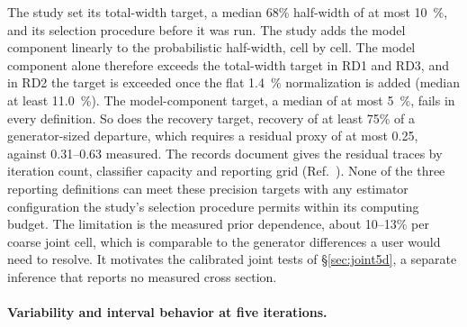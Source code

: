 The study set its total-width target, a median 68\% half-width of at most \SI{10}{\percent}, and its selection procedure before it was run. The study adds the model component linearly to the probabilistic half-width, cell by cell. The model component alone therefore exceeds the total-width target in RD1 and RD3, and in RD2 the target is exceeded once the flat \SI{1.4}{\percent} normalization is added (median at least \SI{11.0}{\percent}). The model-component target, a median of at most \SI{5}{\percent}, fails in every definition. So does the recovery target, recovery of at least 75\% of a generator-sized departure, which requires a residual proxy of at most 0.25, against 0.31--0.63 measured. The records document gives the residual traces by iteration count, classifier capacity and reporting grid (Ref.~\cite{NoteRecords2026}). None of the three reporting definitions can meet these precision targets with any estimator configuration the study's selection procedure permits within its computing budget. The limitation is the measured prior dependence, about 10--13\% per coarse joint cell, which is comparable to the generator differences a user would need to resolve. It motivates the calibrated joint tests of \S\ref{sec:joint5d}, a separate inference that reports no measured cross section.

\paragraph{Variability and interval behavior at five iterations.}

